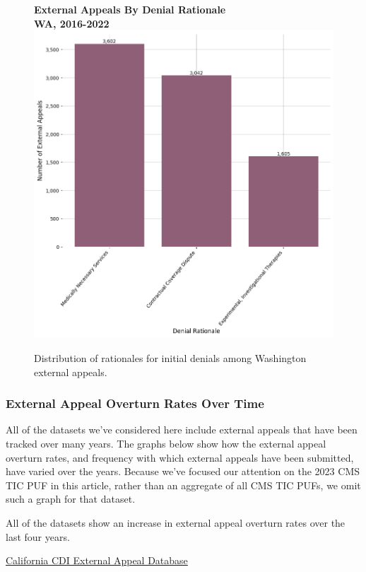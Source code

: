 \documentclass[12pt, a4paper,twoside,parskip=full]{report}
\theoremstyle{plain} %
\theoremstyle{definition} %
\theoremstyle{remark} %
\numberwithin{equation}{chapter}
\begin{document}
		\begin{figure}[h!]
			\centering
			\textbf{External Appeals By Denial Rationale}\\
			\textbf{WA, 2016-2022}\\
			\includegraphics[width=.8\textwidth]{images/wa_external_appeals/external_appeals_by_denial_reason.png}
			\caption{Distribution of rationales for initial denials among Washington external appeals.}
			\label{waexternalappealsbyrationale}
		\end{figure}
	
		\clearpage
		
		\subsubsection{External Appeal Overturn Rates Over Time}
		
		All of the datasets we've considered here include external appeals that have been tracked over many years. The graphs below show how the external appeal overturn rates, and frequency with which external appeals have been submitted, have varied over the years. Because we've focused our attention on the 2023 CMS TIC PUF in this article, rather than an aggregate of all CMS TIC PUFs, we omit such a graph for that dataset.
		
		All of the datasets show an increase in external appeal overturn rates over the last four years.
		
		\underline{California CDI External Appeal Database}
		
\end{document}
